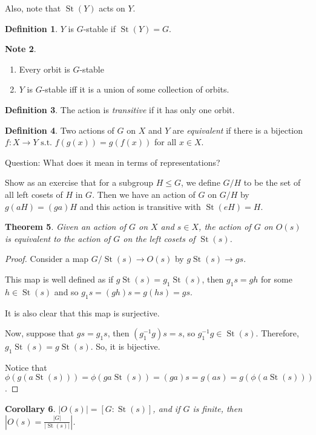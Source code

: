 \documentclass{amsart}
\newtheorem{thm}{Theorem}[section]
\newtheorem{cor}[thm]{Corollary}
\theoremstyle{definition}
\newtheorem{definition}[thm]{Definition}
\newtheorem{note}[thm]{Note}
\newcommand{\st}{\text{ s.t. }}
\DeclareMathOperator{\St}{St}
\begin{document}
Also, note that $\St(Y)$ acts on $Y$.
\begin{definition}
	$Y$ is $G$-stable if $\St(Y)=G$.
\end{definition}
\begin{note}
\begin{enumerate}
	\item Every orbit is $G$-stable
	\item $Y$ is $G$-stable iff it is a union of some collection of orbits.
\end{enumerate}	
\end{note}
\begin{definition}
	The action is \emph{transitive} if it has only one orbit.
\end{definition}
\begin{definition}
	Two actions of $G$ on $X$ and $Y$ are \emph{equivalent} if there is a bijection $f:X\to Y\st f(g(x))=g(f(x))$ for all $x\in X$. 
\end{definition}
Question: What does it mean in terms of representations?

Show as an exercise that for a subgroup $H\leq G$, we define $G/H$ to be the set of all left cosets of $H$ in $G$. Then we have an action of $G$ on $G/H$ by $g(aH)=(ga)H$ and this action is transitive with $\St(eH)=H$.

\begin{thm}
	Given an action of $G$ on $X$ and $s\in X$, the action of $G$ on $O(s)$ is equivalent to the action of $G$ on the left cosets of $\St(s)$.
\end{thm}
\begin{proof}
	Consider a map $G/\St(s)\to O(s)$ by $g\St(s)\to gs$.
	
	This map is well defined as if $g\St(s)=g_1\St(s)$, then $g_1s=gh$ for some $h\in \St(s)$ and so $g_1s=(gh)s=g(hs)=gs$.
	
	It is also clear that this map is surjective.
	
	Now, suppose that $gs=g_1s$, then $(g_1^{-1}g)s=s$, so $g_1^{-1}g\in \St(s)$. Therefore, $g_1\St(s)=g\St(s)$. So, it is bijective.
	
	Notice that $\phi(g(a\St(s)))=\phi(ga\St(s))=(ga)s=g(as)=g(\phi(a\St(s)))$.
\end{proof}
\begin{cor}
	$|O(s)|=[G:\St(s)]$, and if $G$ is finite, then $|O(s)=\frac{|G|}{|\St(s)|}|$.
\end{cor}
\end{document}
